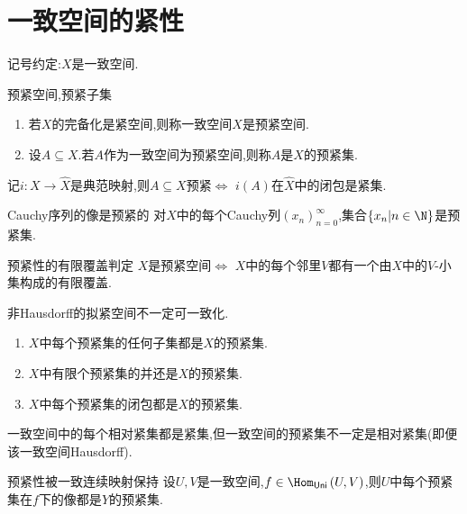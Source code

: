 \section{一致空间的紧性}

记号约定:$X$是一致空间.

\begin{definition}{预紧空间,预紧子集}{}
	\begin{enumerate}
		\item 若$X$的完备化是紧空间,则称一致空间$X$是预紧空间.
		\item 设$A\subseteq X$.若$A$作为一致空间为预紧空间,则称$A$是$X$的预紧集.
	\end{enumerate}
\end{definition}

\begin{remark}{}{}
	记$i:X\to\hat{X}$是典范映射,则$A\subseteq X$预紧$\iff$ $i\left(A\right)$在$\hat{X}$中的闭包是紧集.
\end{remark}

\begin{example}{Cauchy序列的像是预紧的}{}
	对$X$中的每个Cauchy列$\left(x_{n}\right)_{n=0}^{\infty}$,集合$\left\{x_{n}\middle|n\in\N\right\}$是预紧集.
\end{example}

\begin{theorem}{预紧性的有限覆盖判定}{}
	$X$是预紧空间$\iff$ $X$中的每个邻里$V$都有一个由$X$中的$V$-小集构成的有限覆盖.
\end{theorem}

\begin{remark}{}{}
	非Hausdorff的拟紧空间不一定可一致化.
\end{remark}

\begin{proposition}{}{}
	\begin{enumerate}
		\item $X$中每个预紧集的任何子集都是$X$的预紧集.
		\item $X$中有限个预紧集的并还是$X$的预紧集.
		\item $X$中每个预紧集的闭包都是$X$的预紧集.
	\end{enumerate}
\end{proposition}

\begin{remark}{}{}
	一致空间中的每个相对紧集都是紧集,但一致空间的预紧集不一定是相对紧集(即便该一致空间Hausdorff).
\end{remark}

\begin{proposition}{预紧性被一致连续映射保持}{}
	设$U,V$是一致空间,$f\in\Hom_{\mathsf{Uni}}\left(U,V\right)$,则$U$中每个预紧集在$f$下的像都是$Y$的预紧集.
\end{proposition}

